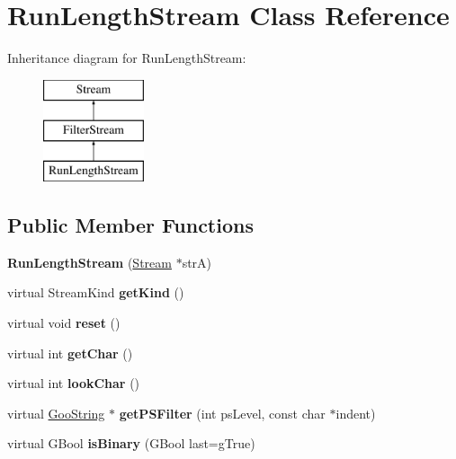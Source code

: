 \hypertarget{class_run_length_stream}{}\section{Run\+Length\+Stream Class Reference}
\label{class_run_length_stream}
Inheritance diagram for Run\+Length\+Stream\+:\begin{figure}[H]
\begin{center}
\leavevmode
\includegraphics[height=3.000000cm]{class_run_length_stream}
\end{center}
\end{figure}
\subsection*{Public Member Functions}
\begin{DoxyCompactItemize}
\item 
\mbox{\label{class_run_length_stream_a008f5bb5f09b076cbd8f0d3d3dc7deb2}} 
{\bfseries Run\+Length\+Stream} (\hyperlink{class_stream}{Stream} $\ast$strA)
\item 
\mbox{\label{class_run_length_stream_ade3a0fd1029235078310ed59f9f0fad5}} 
virtual Stream\+Kind {\bfseries get\+Kind} ()
\item 
\mbox{\label{class_run_length_stream_acf762639d87ce02c189a23a2c53709cb}} 
virtual void {\bfseries reset} ()
\item 
\mbox{\label{class_run_length_stream_adf0328f69276adc5d51b541584e21b68}} 
virtual int {\bfseries get\+Char} ()
\item 
\mbox{\label{class_run_length_stream_aaecbf5d2674bb52bb79508f9badd9c19}} 
virtual int {\bfseries look\+Char} ()
\item 
\mbox{\label{class_run_length_stream_a87876602475465ac341718e09766f8d2}} 
virtual \hyperlink{class_goo_string}{Goo\+String} $\ast$ {\bfseries get\+P\+S\+Filter} (int ps\+Level, const char $\ast$indent)
\item 
\mbox{\label{class_run_length_stream_a496b1d19376d3167f5a642726f775986}} 
virtual G\+Bool {\bfseries is\+Binary} (G\+Bool last=g\+True)
\end{DoxyCompactItemize}
